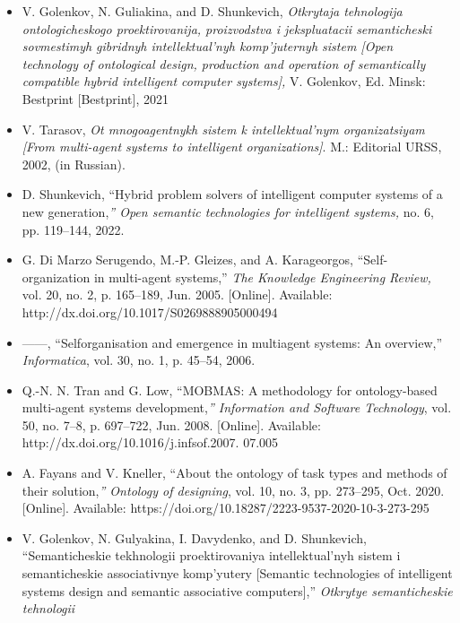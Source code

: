 \begin{multicols}{2}
\begin{itemize}
{technologies for intelligent systems,}no. 6, pp. 347–356, 2022.
\renewcommand{\labelitemi}{[9]}
\item  V. Golenkov, N. Guliakina, and D. Shunkevich, \textit{Otkrytaja
tehnologija ontologicheskogo proektirovanija, proizvodstva
i jekspluatacii semanticheski sovmestimyh gibridnyh
intellektual’nyh komp’juternyh sistem [Open technology of
ontological design, production and operation of semantically
compatible hybrid intelligent computer systems],} V. Golenkov,
Ed. Minsk: Bestprint [Bestprint], 2021
\renewcommand{\labelitemi}{[10]}
\item  V. Tarasov,\textit{ Ot mnogoagentnykh sistem k intellektual’nym
organizatsiyam [From multi-agent systems to intelligent
organizations]}. M.: Editorial URSS, 2002, (in Russian).
\renewcommand{\labelitemi}{[11]}
\item D. Shunkevich, “Hybrid problem solvers of intelligent computer
systems of a new generation,\textit{” Open semantic technologies for
intelligent systems,} no. 6, pp. 119–144, 2022.
\renewcommand{\labelitemi}{[12]}
\item G. Di Marzo Serugendo, M.-P. Gleizes, and A. Karageorgos,
“Self-organization in multi-agent systems,”\textit{ The Knowledge Engineering Review,} vol. 20, no. 2, p. 165–189, Jun. 2005. [Online].
Available: http://dx.doi.org/10.1017/S0269888905000494
\renewcommand{\labelitemi}{[13]}
\item   ——, “Selforganisation and emergence in multiagent systems: An
overview,” \textit{Informatica}, vol. 30, no. 1, p. 45–54, 2006.
\renewcommand{\labelitemi}{[14]}
\item Q.-N. N. Tran and G. Low, “MOBMAS: A methodology for
ontology-based multi-agent systems development,\textit{” Information
and Software Technology}, vol. 50, no. 7–8, p. 697–722, Jun.
2008. [Online]. Available: http://dx.doi.org/10.1016/j.infsof.2007.
07.005
\renewcommand{\labelitemi}{[15]}
\item
A. Fayans and V. Kneller, “About the ontology of task
types and methods of their solution,\textit{” Ontology of designing},
vol. 10, no. 3, pp. 273–295, Oct. 2020. [Online]. Available:
https://doi.org/10.18287/2223-9537-2020-10-3-273-295
\renewcommand{\labelitemi}{[16]}
\item
V. Golenkov, N. Gulyakina, I. Davydenko, and D. Shunkevich,
“Semanticheskie tekhnologii proektirovaniya intellektual’nyh
sistem i semanticheskie associativnye komp’yutery [Semantic
technologies of intelligent systems design and semantic
associative computers],”\textit{ Otkrytye semanticheskie tehnologii
}
\end{itemize}
\end{multicols}
